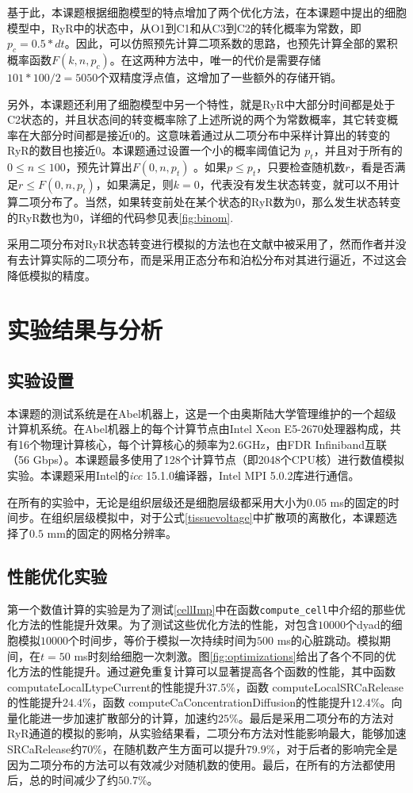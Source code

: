 基于此，本课题根据细胞模型的特点增加了两个优化方法，在本课题中提出的细胞模型中，RyR中的状态中，从O1到C1和从C3到C2的转化概率为常数，即$p_c=0.5*dt$。因此，可以仿照预先计算二项系数的思路，也预先计算全部的累积概率函数$F(k,n,p_c)$。在这两种方法中，唯一的代价是需要存储$101*100/2=5050$个双精度浮点值，这增加了一些额外的存储开销。

另外，本课题还利用了细胞模型中另一个特性，就是RyR中大部分时间都是处于C2状态的，并且状态间的转变概率除了上述所说的两个为常数概率，其它转变概率在大部分时间都是接近0的。这意味着通过从二项分布中采样计算出的转变的RyR的数目也接近0。本课题通过设置一个小的概率阈值记为 $p_t$，并且对于所有的$0 \leq n \leq 100$，预先计算出$F(0,n,p_t)$ 。如果$p \leq p_t$，只要检查随机数$r$，看是否满足$r \leq F(0,n,p_t)$，如果满足，则$k=0$，代表没有发生状态转变，就可以不用计算二项分布了。当然，如果转变前处在某个状态的RyR数为0，那么发生状态转变的RyR数也为0，详细的代码参见表\ref{fig:binom}.

采用二项分布对RyR状态转变进行模拟的方法也在文献中被采用了，然而作者并没有去计算实际的二项分布，而是采用正态分布和泊松分布对其进行逼近，不过这会降低模拟的精度。
   
   
\section{实验结果与分析}
\subsection{实验设置}

本课题的测试系统是在Abel机器上，这是一个由奥斯陆大学管理维护的一个超级计算机系统。在Abel机器上的每个计算节点由Intel Xeon E5-2670处理器构成，共有16个物理计算核心，每个计算核心的频率为2.6GHz，由FDR Infiniband互联（56 Gbps）。本课题最多使用了128个计算节点（即2048个CPU核）进行数值模拟实验。本课题采用Intel的\textit{icc} 15.1.0编译器，Intel MPI 5.0.2库进行通信。

在所有的实验中，无论是组织层级还是细胞层级都采用大小为$0.05$ ms的固定的时间步。在组织层级模拟中，对于公式\ref{tissuevoltage}中扩散项的离散化，本课题选择了$0.5$ mm的固定的网格分辨率。

\subsection{性能优化实验}
第一个数值计算的实验是为了测试\ref{cellImp}中在函数{\tt compute\_cell}中介绍的那些优化方法的性能提升效果。为了测试这些优化方法的性能，对包含$10000$个dyad的细胞模拟$10000$个时间步，等价于模拟一次持续时间为$500$ ms的心脏跳动。模拟期间，在$t=50$ ms时刻给细胞一次刺激。图\ref{fig:optimizations}给出了各个不同的优化方法的性能提升。通过避免重复计算可以显著提高各个函数的性能，其中函数{ computateLocalLtypeCurrent}的性能提升$37.5\%$，函数{ computeLocalSRCaRelease}的性能提升$24.4\%$，函数{ computeCaConcentrationDiffusion}的性能提升$12.4\%$。向量化能进一步加速扩散部分的计算，加速约$25\%$。最后是采用二项分布的方法对RyR通道的模拟的影响，从实验结果看，二项分布方法对性能影响最大，能够加速SRCaRelease约$70\%$，在随机数产生方面可以提升$79.9\%$，对于后者的影响完全是因为二项分布的方法可以有效减少对随机数的使用。最后，在所有的方法都使用后，总的时间减少了约$50.7\%$。

